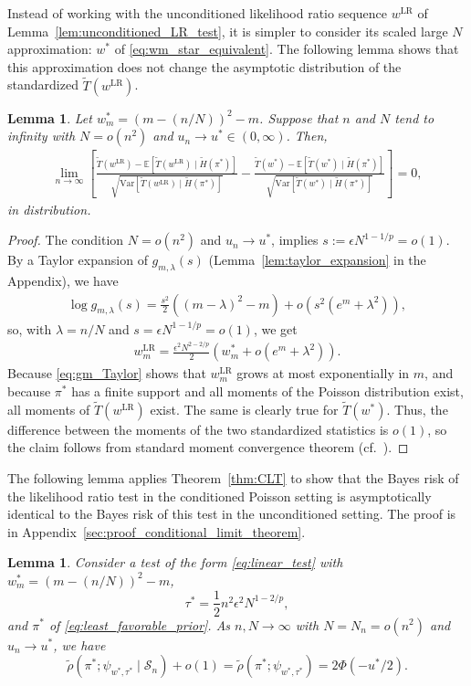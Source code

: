 \documentclass[11pt]{article}
\newtheorem{lem}[thm]{Lemma}
\numberwithin{equation}{section}
\newcommand{\LR}{\mathrm{LR}}
\newcommand{\Scal}{\mathcal{S}}
\newcommand{\Var}[1]{\mathrm{Var}\left[ #1\right]}
\newcommand{\ex}[1]{\ensuremath{\mathbb{E}\left[ #1\right]}}
\begin{document}
Instead of working with the unconditioned likelihood ratio sequence $w^{\LR}$ of Lemma~\ref{lem:unconditioned_LR_test}, it is simpler to consider its scaled large $N$ approximation: $w^*$ of \eqref{eq:wm_star_equivalent}. The following lemma shows that this approximation does not change the asymptotic distribution of the standardized $\tilde{T}(w^{\LR})$.
\begin{lem} 
\label{lem:weight_approximation}
    Let $w_m^* = (m-(n/N))^2 - m$. Suppose that $n$ and $N$ tend to infinity with $N = o(n^2)$ and $u_n \to u^* \in (0,\infty)$. Then, 
    \begin{align} 
        \lim_{n \to \infty} \left[ \frac{\tilde{T}(w^{\LR})-\ex{\tilde{T}(w^{\LR}) \mid \tilde{H}(\pi^*)}}{\sqrt{\Var{\tilde{T}(w^{\LR}) \mid \tilde{H}(\pi^*)}}} - \frac{\tilde{T}(w^*)-\ex{\tilde{T}(w^*) \mid \tilde{H}(\pi^*)}}{\sqrt{\Var{\tilde{T}(w^*) \mid \tilde{H}(\pi^*)}}}  \right] = 0, 
    \end{align}
    in distribution. 
\end{lem}

\begin{proof}
The condition $N = o(n^2)$ and $u_n \to u^*$, implies $s := \epsilon N^{1-1/p} = o(1)$. By a Taylor expansion of $g_{m,\lambda}(s)$ (Lemma~\ref{lem:taylor_expansion} in the Appendix), we have
\begin{align*}
    \log g_{m,\lambda}(s) = \frac{s^2}{2} \left((m-\lambda)^2 - m \right) + o\!\left(s^2(e^m + \lambda^2)\right), 
\end{align*}
so, with $\lambda = n/N$ and $s = \epsilon N^{1-1/p} = o(1)$, we get
\begin{align}
\label{eq:gm_Taylor}
w^{\LR}_m = \frac{\epsilon^2 N^{2-2/p}}{2} \left(w_m^* + o(e^m + \lambda^2)\right).
\end{align}
Because \eqref{eq:gm_Taylor} shows that $w^{\LR}_m$ grows at most exponentially in $m$, and because $\pi^*$ has a finite support and all moments of the Poisson distribution exist, all moments of $\tilde{T}(w^{\LR})$ exist. The same is clearly true for $\tilde{T}(w^*)$. Thus, the difference between the moments of the two standardized statistics is $o(1)$, so the claim follows from standard moment convergence theorem (cf.\ \cite{anderson2010introduction}). 
\end{proof}

The following lemma applies Theorem~\ref{thm:CLT} to show that the Bayes risk of the likelihood ratio test in the conditioned Poisson setting is asymptotically identical to the Bayes risk of this test in the unconditioned setting. The proof is in Appendix~\ref{sec:proof_conditional_limit_theorem}.
\begin{lem}
    \label{lem:conditional_limit_theorem}
    Consider a test of the form \eqref{eq:linear_test} with
    $w_m^* = (m-(n/N))^2 - m$, 
    \[
    \tau^* = \frac{1}{2} n^2 \epsilon^2 N^{1-2/p},
    \]
    and $\pi^*$ of \eqref{eq:least_favorable_prior}. As $n,N \to \infty$ with $N = N_n = o(n^2)$ and $u_n \to u^*$, we have
    \[
    \tilde{\rho}(\pi^*; \psi_{w^*,\tau^*} \mid \Scal_n) + o(1) = \tilde{\rho}(\pi^*; \psi_{w^*,\tau^*}) = 2\Phi(-u^*/2).
    \]
\end{lem}
\end{document}

